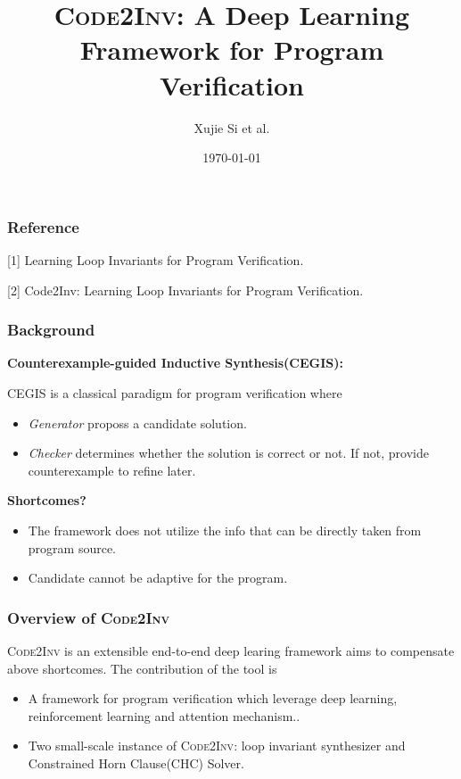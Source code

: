 \documentclass[11pt]{beamer}
\title{\textsc{Code2Inv}: A Deep Learning Framework for Program Verification}
\date{\today}
\author{Xujie Si et al.}
\begin{document}
\maketitle

\begin{frame}\frametitle{Reference}
[1] Learning Loop Invariants for Program Verification.

[2] Code2Inv: Learning Loop Invariants for Program Verification.
\end{frame}

\begin{frame}\frametitle{Background}
\textbf{Counterexample-guided Inductive Synthesis(CEGIS):}

CEGIS is a classical paradigm for program verification where
\begin{itemize}
\item \textit{Generator} proposs a candidate solution.
\item \textit{Checker} determines whether the solution is correct or not. If not, provide counterexample to refine later.
\end{itemize}

\textbf{Shortcomes?}
\begin{itemize}
\item The framework does not utilize the info that can be directly taken from program source.
\item Candidate cannot be adaptive for the program.
\end{itemize}

\end{frame}

\begin{frame}\frametitle{Overview of \textsc{Code2Inv}}
\textsc{Code2Inv} is an extensible end-to-end  deep learing framework aims to compensate above shortcomes. The contribution of the tool is 
\begin{itemize}
\item A framework for program verification which leverage deep learning, reinforcement learning and attention mechanism..
\item Two small-scale instance of \textsc{Code2Inv}: loop invariant synthesizer and Constrained Horn Clause(CHC) Solver.
\end{itemize}
\end{frame}
\end{document}
